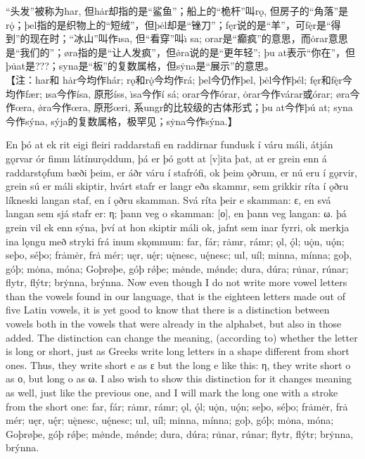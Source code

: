 \begin{translation*}{}
  “头发”被称为har, 但hȧr却指的是“鲨鱼”；船上的“桅杆”叫rǫ, 但房子的“角落”是rǫ̇；þel指的是织物上的“短绒”，但þėl却是“锉刀”；fęr说的是“羊”，可fę̇r是“得到”的现在时；“冰山”叫作ısa, 但“看穿”叫ı̇ sa; orar是“癫疯”的意思，而ȯrar意思是“我们的”；øra指的是“让人发疯”，但ø̇ra说的是“更年轻”; þu at表示“你在”，但þu̇at是???；syna是“板”的复数属格，但sẏna是“展示”的意思。\\

  【注：har和 h\.{a}r今均作hár; rǫ和r\.{ǫ}今均作rá; þel今仍作þel, þ\.{e}l今作þél; fęr和f\.{ę}r今均作fær; ısa今作ísa, 原形íss, \.{ı}sa今作í sá; orar今作órar, \.{o}rar今作várar或órar; øra今作œra, \.{ø}ra今作œra, 原形œri, 系ungr的比较级的古体形式；þu at今作þú at; syna今作sýna, sýja的复数属格，极罕见；s\.{y}na今作sýna.】
\end{translation*}
\begin{paracol}{2}
  En þó at ek rit eigi fleiri raddarstafi en raddirnar fundusk í váru máli, átján gǫrvar ór fimm látínurǫddum, þá er þó gott at [v]ita þat, at er grein enn á raddarstǫfum bæði þeim, er áðr váru í stafrófi, ok þeim ǫðrum, er nú eru í gǫrvir, grein sú er máli skiptir, hvárt stafr er langr eða skammr, sem grikkir ríta í ǫðru líkneski langan staf, en í ǫðru skamman. Svá ríta þeir e skamman: ε, en svá langan sem sjá stafr er: η; þann veg o skamman: [ο], en þann veg langan: ω. þá grein vil ek enn sýna, því at hon skiptir máli ok, jafnt sem inar fyrri, ok merkja ina lǫngu með stryki frá inum skǫmmum: far, fár; rȧmr, rámr; ǫl, ǫ́l; uǫ̇n, uǫ́n; seþo, séþo; frȧmėr, frȧ mér; uęr, uę́r; uę̇nesc, uę́nesc; uıl, uíl; minna, mínna; goþ, góþ; mȯna, móna; Goþrøþe, góþ rǿþe; mø̇nde, mǿnde; dura, dúra; ru̇nar, rúnar; flytr, flýtr; brẏnna, brýnna.
  \switchcolumn
  Now even though I do not write more vowel letters than the vowels found in our language, that is the eighteen letters made out of five Latin vowels, it is yet good to know that there is a distinction between vowels both in the vowels that were already in the alphabet, but also in those added. The distinction can change the meaning, (according to) whether the letter is long or short, just as Greeks write long letters in a shape different from short ones. Thus, they write short e as ε but the long e like this: η, they write short o as ο, but long o as ω. I also wish to show this distinction for it changes meaning as well, just like the previous one, and I will mark the long one with a stroke from the short one: far, fár; rȧmr, rámr; ǫl, ǫ́l; uǫ̇n, uǫ́n; seþo, séþo; frȧmėr, frȧ mér; uęr, uę́r; uę̇nesc, uę́nesc; uıl, uíl; minna, mínna; goþ, góþ; mȯna, móna; Goþrøþe, góþ rǿþe; mø̇nde, mǿnde; dura, dúra; ru̇nar, rúnar; flytr, flýtr; brẏnna, brýnna.
\end{paracol}
